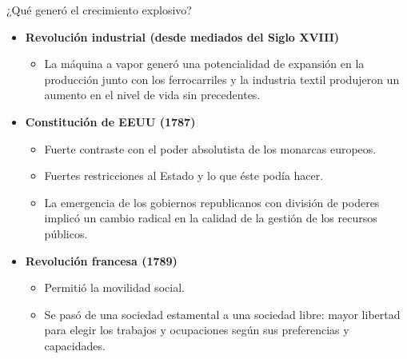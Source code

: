 \documentclass{beamer}
\begin{document}
\begin{frame}{¿Qué generó el crecimiento explosivo?}
    \begin{itemize}
    \item \textbf{Revolución industrial (desde mediados del Siglo XVIII)}
    \begin{itemize}
        \item La máquina a vapor generó una potencialidad de expansión en la producción junto con los ferrocarriles y la industria textil produjeron un aumento en el nivel de vida sin precedentes.
    \end{itemize}

    \item \textbf{Constitución de EEUU (1787)}
     \begin{itemize}
        \item Fuerte contraste con el poder absolutista de los monarcas europeos.
        \item Fuertes restricciones al Estado y lo que éste podía hacer.
        \item La emergencia de los gobiernos republicanos con división de poderes implicó un cambio radical en la calidad de la gestión de los recursos públicos.
        \end{itemize}
        
    \item \textbf{Revolución francesa (1789)}
    \begin{itemize}
        \item Permitió la movilidad social.
        \item Se pasó de una sociedad estamental a una sociedad libre: mayor libertad para elegir los trabajos y ocupaciones según sus preferencias y capacidades.
    \end{itemize}
\end{itemize}
\end{frame}

\end{document}
